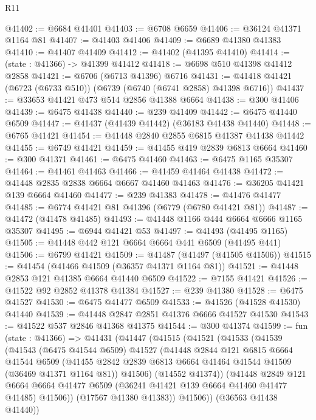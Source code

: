 \begin{lexlean}{R11}
\begin{coremodule}
@41402 := @6684 @41401
@41403 := @6708 @6659
@41406 := @36124 @41371 @1164 @81
@41407 := @41403 @41406
@41409 := @6689 @41380 @41383
@41410 := @41407 @41409
@41412 := @41402 (@41395 @41410)
@41414 := (state : @41366) -> @41399 @41412
@41418 := @6698 @510 @41398 @41412 @2858
@41421 := @6706 (@6713 @41396) @6716
@41431 := @41418 @41421 (@6723 (@6733 @510)) (@6739 (@6740 (@6741 @2858) @41398 @6716))
@41437 := @33653 @41421 @473 @514 @2856 @41388 @6664
@41438 := @300 @41406
@41439 := @6475 @41438
@41440 := @239 @41409
@41442 := @6475 @41440 @6509
@41447 := @41437 (@41439 @41442) (@36183 @41438 @41440)
@41448 := @6765 @41421
@41454 := @41448 @2840 @2855 @6815 @41387 @41438 @41442
@41455 := @6749 @41421
@41459 := @41455 @419 @2839 @6813 @6664
@41460 := @300 @41371
@41461 := @6475 @41460
@41463 := @6475 @1165 @35307
@41464 := @41461 @41463
@41466 := @41459 @41464 @41438
@41472 := @41448 @2835 @2838 @6664 @6667 @41460 @41463
@41476 := @36205 @41421 @139 @6664 @41460
@41477 := @239 @41383
@41478 := @41476 @41477
@41485 := @6774 @41421 @81 @41396 (@6779 (@6780 @41421 @81))
@41487 := @41472 (@41478 @41485)
@41493 := @41448 @1166 @444 @6664 @6666 @1165 @35307
@41495 := @6944 @41421 @53
@41497 := @41493 (@41495 @1165)
@41505 := @41448 @442 @121 @6664 @6664 @441 @6509 (@41495 @441)
@41506 := @6799 @41421
@41509 := @41487 (@41497 (@41505 @41506))
@41515 := @41454 (@41466 @41509 (@36357 @41371 @1164 @81))
@41521 := @41448 @2853 @121 @41385 @6664 @41440 @6509
@41522 := @7155 @41421
@41526 := @41522 @92 @2852 @41378 @41384
@41527 := @239 @41380
@41528 := @6475 @41527
@41530 := @6475 @41477 @6509
@41533 := @41526 (@41528 @41530) @41440
@41539 := @41448 @2847 @2851 @41376 @6666 @41527 @41530
@41543 := @41522 @537 @2846 @41368 @41375
@41544 := @300 @41374
@41599 := fun (state : @41366) =>
  @41431
    (@41447
      (@41515
        (@41521
          (@41533
            (@41539
              (@41543
                (@6475 @41544 @6509)
                @41527
                (@41448
                  @2844
                  @121
                  @6815
                  @6664
                  @41544
                  @6509
                  (@41455 @2842 @2839 @6813 @6664 @41464 @41544 @41509 (@36469 @41371 @1164 @81))
                  @41506)
                (@14552 @41374))
              (@41448
                @2849
                @121
                @6664
                @6664
                @41477
                @6509
                (@36241 @41421 @139 @6664 @41460 @41477 @41485)
                @41506))
            (@17567 @41380 @41383))
          @41506))
      (@36563 @41438 @41440))

\end{coremodule}
\end{lexlean}
